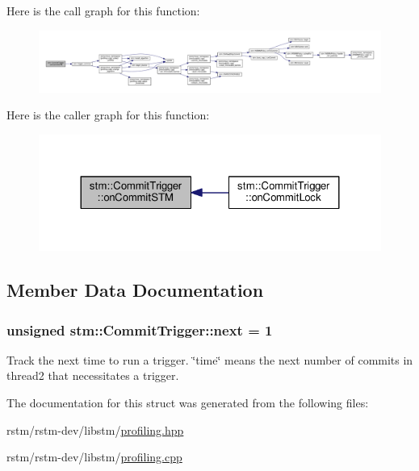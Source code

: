 Here is the call graph for this function\-:
\nopagebreak
\begin{figure}[H]
\begin{center}
\leavevmode
\includegraphics[width=350pt]{structstm_1_1CommitTrigger_acdf3280966d01d057c2efc8ff1792aab_cgraph}
\end{center}
\end{figure}




Here is the caller graph for this function\-:
\nopagebreak
\begin{figure}[H]
\begin{center}
\leavevmode
\includegraphics[width=324pt]{structstm_1_1CommitTrigger_acdf3280966d01d057c2efc8ff1792aab_icgraph}
\end{center}
\end{figure}




\subsection{Member Data Documentation}
\hypertarget{structstm_1_1CommitTrigger_a03a352eb791b73886d5ddcc8242a1a69}{
\subsubsection[{next}]{\setlength{\rightskip}{0pt plus 5cm}unsigned stm\-::\-Commit\-Trigger\-::next = 1\hspace{0.3cm}{\ttfamily [static]}}}\label{structstm_1_1CommitTrigger_a03a352eb791b73886d5ddcc8242a1a69}
Track the next time to run a trigger. \char`\"{}time\char`\"{} means the next number of commits in thread2 that necessitates a trigger. 

The documentation for this struct was generated from the following files\-:\begin{DoxyCompactItemize}
\item 
rstm/rstm-\/dev/libstm/\hyperlink{profiling_8hpp}{profiling.\-hpp}\item 
rstm/rstm-\/dev/libstm/\hyperlink{profiling_8cpp}{profiling.\-cpp}\end{DoxyCompactItemize}
